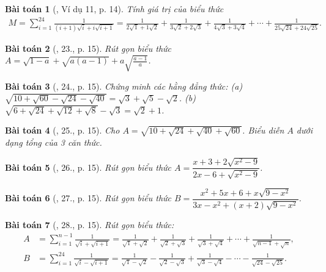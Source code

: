 \documentclass{article}
\newtheorem{baitoan}{Bài toán}
\begin{document}
\begin{baitoan}[\cite{Binh_Toan_9_tap_1}, Ví dụ 11, p. 14]
	Tính giá trị của biểu thức
	\begin{align*}
		M = \sum_{i=1}^{24} \frac{1}{(i + 1)\sqrt{i} + i\sqrt{i + 1}} = \frac{1}{2\sqrt{1} + 1\sqrt{2}} + \frac{1}{3\sqrt{2} + 2\sqrt{3}} + \frac{1}{4\sqrt{3} + 3\sqrt{4}} + \cdots + \frac{1}{25\sqrt{24} + 24\sqrt{25}}.
	\end{align*}
\end{baitoan}

\begin{baitoan}[\cite{Binh_Toan_9_tap_1}, 23., p. 15]
	Rút gọn biểu thức $A = \sqrt{1 - a} + \sqrt{a(a - 1)} + a\sqrt{\frac{a - 1}{a}}$.
\end{baitoan}

\begin{baitoan}[\cite{Binh_Toan_9_tap_1}, 24., p. 15]
	Chứng minh các hằng đẳng thức: (a) $\sqrt{10 + \sqrt{60} - \sqrt{24} - \sqrt{40}} = \sqrt{3} + \sqrt{5} - \sqrt{2}$. (b) $\sqrt{6 + \sqrt{24} + \sqrt{12} + \sqrt{8}} - \sqrt{3} = \sqrt{2} + 1$.
\end{baitoan}

\begin{baitoan}[\cite{Binh_Toan_9_tap_1}, 25., p. 15]
	Cho $A = \sqrt{10 + \sqrt{24} + \sqrt{40} + \sqrt{60}}$. Biểu diễn $A$ dưới dạng tổng của 3 căn thức.
\end{baitoan}

\begin{baitoan}[\cite{Binh_Toan_9_tap_1}, 26., p. 15]
	Rút gọn biểu thức $A = \dfrac{x + 3 + 2\sqrt{x^2 - 9}}{2x - 6 + \sqrt{x^2 - 9}}$.
\end{baitoan}

\begin{baitoan}[\cite{Binh_Toan_9_tap_1}, 27., p. 15]
	Rút gọn biểu thức $B = \dfrac{x^2 + 5x + 6 + x\sqrt{9 - x^2}}{3x - x^2 + (x + 2)\sqrt{9 - x^2}}$.
\end{baitoan}

\begin{baitoan}[\cite{Binh_Toan_9_tap_1}, 28., p. 15]
	Rút gọn biểu thức:
	\begin{align*}
		A &= \sum_{i=1}^{n-1} \frac{1}{\sqrt{i} + \sqrt{i + 1}} = \frac{1}{\sqrt{1} + \sqrt{2}} + \frac{1}{\sqrt{2} + \sqrt{3}} + \frac{1}{\sqrt{3} + \sqrt{4}} + \cdots + \frac{1}{\sqrt{n - 1} + \sqrt{n}},\\
		B &= \sum_{i=1}^{24} \frac{1}{\sqrt{i} - \sqrt{i + 1}} = \frac{1}{\sqrt{1} - \sqrt{2}} - \frac{1}{\sqrt{2} - \sqrt{3}} + \frac{1}{\sqrt{3} - \sqrt{4}} - \cdots - \frac{1}{\sqrt{24} - \sqrt{25}}.
	\end{align*}
\end{baitoan}
\end{document}
